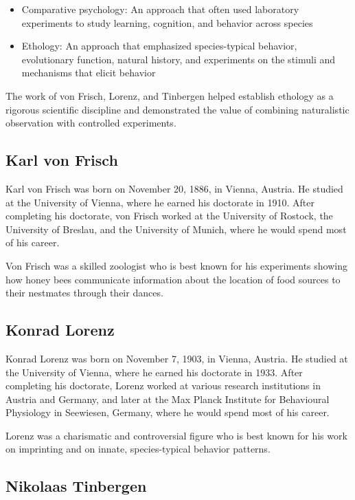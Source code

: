 \begin{itemize}
\item Comparative psychology: An approach that often used laboratory experiments to study learning, cognition, and behavior across species
\item Ethology: An approach that emphasized species-typical behavior, evolutionary function, natural history, and experiments on the stimuli and mechanisms that elicit behavior
\end{itemize}

The work of von Frisch, Lorenz, and Tinbergen helped establish ethology as a rigorous scientific discipline and demonstrated the value of combining naturalistic observation with controlled experiments.

\subsection{Karl von Frisch}

Karl von Frisch was born on November 20, 1886, in Vienna, Austria. He studied at the University of Vienna, where he earned his doctorate in 1910. After completing his doctorate, von Frisch worked at the University of Rostock, the University of Breslau, and the University of Munich, where he would spend most of his career.

Von Frisch was a skilled zoologist who is best known for his experiments showing how honey bees communicate information about the location of food sources to their nestmates through their dances.

\subsection{Konrad Lorenz}

Konrad Lorenz was born on November 7, 1903, in Vienna, Austria. He studied at the University of Vienna, where he earned his doctorate in 1933. After completing his doctorate, Lorenz worked at various research institutions in Austria and Germany, and later at the Max Planck Institute for Behavioural Physiology in Seewiesen, Germany, where he would spend most of his career.

Lorenz was a charismatic and controversial figure who is best known for his work on imprinting and on innate, species-typical behavior patterns.

\subsection{Nikolaas Tinbergen}

